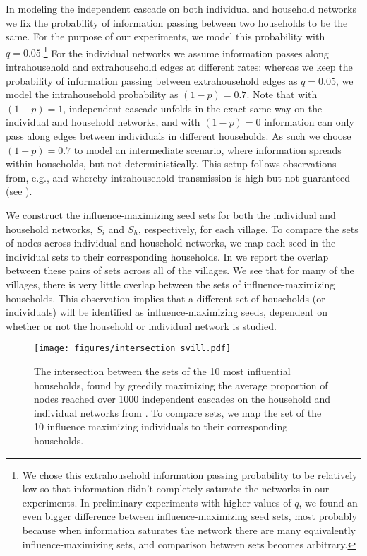 In modeling the independent cascade on both individual and household networks we fix the probability of information passing between two households to be the same. For the purpose of our experiments, we model this probability with $q = 0.05$.\footnote{We chose this extrahousehold information passing probability to be relatively low so that information didn't completely saturate the networks in our experiments. In preliminary experiments with higher values of $q$, we found an even bigger difference between influence-maximizing seed sets, most probably because when information saturates the network there are many equivalently influence-maximizing sets, and comparison between sets becomes arbitrary.} For the individual networks we assume information passes along intrahousehold and extrahousehold edges at different rates: whereas we keep the probability of information passing between extrahousehold edges as $q=0.05$, we model the intrahousehold probability as $(1-p)=0.7$. Note that with $(1-p)=1$, independent cascade unfolds in the exact same way on the individual and household networks, and with $(1-p) = 0$ information can only pass along edges between individuals in different households. As such we choose $(1-p)=0.7$ to model an intermediate scenario, where information spreads within households, but not deterministically. This setup follows observations from, e.g., \cite{nickerson2008} and \cite{cheema2023canvassing} whereby intrahousehold transmission is high but not guaranteed (see ). 

We construct the influence-maximizing seed sets for both the individual and household networks, $S_i$ and $S_h$, respectively, for each village. To compare the sets of nodes across individual and household networks, we map each seed in the individual sets to their corresponding households. In  we report the overlap between these pairs of sets across all of the villages. We see that for many of the villages, there is very little overlap between the sets of influence-maximizing households. This observation implies that a different set of households (or individuals) will be identified as influence-maximizing seeds, dependent on whether or not the household or individual network is studied. 

\begin{figure}
    \centering
    \texttt{[image: figures/intersection\_svill.pdf]}
    \caption{The intersection between the sets of the 10 most influential households, found by greedily maximizing the average proportion of nodes reached over 1000 independent cascades on the household and individual networks from \cite{banerjee2013}. To compare sets, we map the set of the 10 influence maximizing individuals to their corresponding households.}
    \label{fig:jac}
\end{figure}

